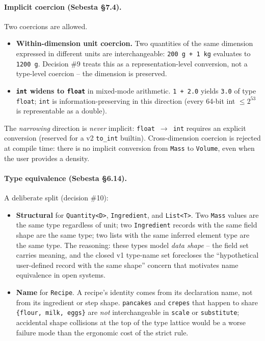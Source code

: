 \documentclass[11pt,a4paper]{article}
\begin{document}
\paragraph{Implicit coercion (Sebesta \S7.4).} Two coercions are allowed.
\begin{itemize}[leftmargin=*,itemsep=2pt]
  \item \textbf{Within-dimension unit coercion.} Two quantities of the
        same dimension expressed in different units are interchangeable:
        \texttt{200 g + 1 kg} evaluates to \texttt{1200 g}. Decision \#9
        treats this as a representation-level conversion, not a
        type-level coercion -- the dimension is preserved.
  \item \textbf{\texttt{int} widens to \texttt{float}} in mixed-mode
        arithmetic. \texttt{1 + 2.0} yields \texttt{3.0} of type
        \texttt{float}; \texttt{int} is information-preserving in this
        direction (every 64-bit int $\leq 2^{53}$ is representable as
        a double).
\end{itemize}

\noindent The \emph{narrowing} direction is \emph{never} implicit:
\texttt{float}~$\to$~\texttt{int} requires an explicit conversion
(reserved for a v2 \texttt{to\_int} builtin). Cross-dimension coercion
is rejected at compile time: there is no implicit conversion from
\texttt{Mass} to \texttt{Volume}, even when the user provides a density.

\paragraph{Type equivalence (Sebesta \S6.14).} A deliberate split
(decision \#10):
\begin{itemize}[leftmargin=*,itemsep=2pt]
  \item \textbf{Structural} for \texttt{Quantity<D>}, \texttt{Ingredient},
        and \texttt{List<T>}. Two \texttt{Mass} values are the same type
        regardless of unit; two \texttt{Ingredient} records with the
        same field shape are the same type; two lists with the same
        inferred element type are the same type. The reasoning: these
        types model \emph{data shape} -- the field set carries
        meaning, and the closed v1 type-name set forecloses the
        ``hypothetical user-defined record with the same shape''
        concern that motivates name equivalence in open systems.
  \item \textbf{Name} for \texttt{Recipe}. A recipe's identity comes
        from its declaration name, not from its ingredient or step
        shape. \texttt{pancakes} and \texttt{crepes} that happen to
        share \texttt{\{flour, milk, eggs\}} are \emph{not}
        interchangeable in \texttt{scale} or \texttt{substitute};
        accidental shape collisions at the top of the type lattice
        would be a worse failure mode than the ergonomic cost of
        the strict rule.
\end{itemize}
\end{document}
